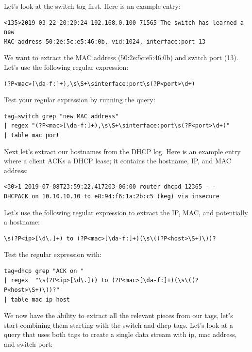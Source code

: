Let's look at the switch tag first. Here is an example entry:

\begin{Verbatim}[breaklines=true]
<135>2019-03-22 20:20:24 192.168.0.100 71565 The switch has learned a new
MAC address 50:2e:5c:e5:46:0b, vid:1024, interface:port 13
\end{Verbatim}

We want to extract the MAC address (50:2e:5c:e5:46:0b) and switch
port (13). Let's use the following regular expression:

\begin{Verbatim}[breaklines=true]
(?P<mac>[\da-f:]+),\s\S+\sinterface:port\s(?P<port>\d+)
\end{Verbatim}

Test your regular expression by running the query:

\begin{Verbatim}[breaklines=true]
tag=switch grep "new MAC address"
| regex "(?P<mac>[\da-f:]+),\s\S+\sinterface:port\s(?P<port>\d+)"
| table mac port
\end{Verbatim}

Next let's extract our hostnames from the DHCP log. Here is an example
entry where a client ACKs a DHCP lease; it contains the hostname,
IP, and MAC address:

\begin{Verbatim}[breaklines=true]
<30>1 2019-07-08T23:59:22.417203-06:00 router dhcpd 12365 - - 
DHCPACK on 10.10.10.10 to e8:94:f6:1a:2b:c5 (keg) via insecure
\end{Verbatim}

Let's use the following regular expression to extract the IP, MAC, and
potentially a hostname:

\begin{Verbatim}[breaklines=true]
\s(?P<ip>[\d\.]+) to (?P<mac>[\da-f:]+)(\s\((?P<host>\S+)\))?
\end{Verbatim}


Test the regular expression with:

\begin{Verbatim}[breaklines=true]
tag=dhcp grep "ACK on " 
| regex  "\s(?P<ip>[\d\.]+) to (?P<mac>[\da-f:]+)(\s\((?P<host>\S+)\))?"
| table mac ip host
\end{Verbatim}

We now have the ability to extract all the relevant pieces from our
tags, let's start combining them starting with the switch and
dhcp tags. Let's look at a query that uses both tags to create a
single data stream with ip, mac address, and switch port:

